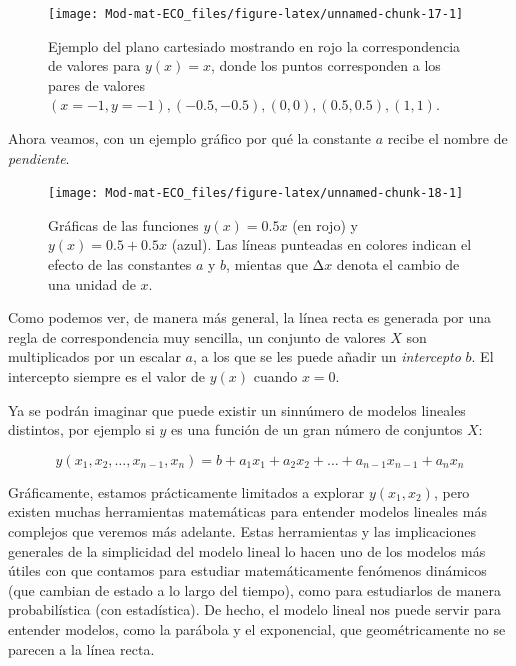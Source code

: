 \documentclass[
]{book}
\begin{document}
\begin{figure}

{\centering \texttt{[image: Mod-mat-ECO\_files/figure-latex/unnamed-chunk-17-1]} 

}

\caption{Ejemplo del plano cartesiado mostrando en rojo la correspondencia de valores para $y(x) = x$, donde los puntos corresponden a los pares de valores $(x = -1, y = -1), (-0.5, -0.5), (0, 0), (0.5, 0.5), (1, 1)$.}\label{fig:unnamed-chunk-17}
\end{figure}

Ahora veamos, con un ejemplo gráfico por qué la constante \(a\) recibe el nombre de \emph{pendiente}.

\begin{figure}

{\centering \texttt{[image: Mod-mat-ECO\_files/figure-latex/unnamed-chunk-18-1]} 

}

\caption{Gráficas de las funciones $y(x) = 0.5 x$ (en rojo) y $y(x) = 0.5 + 0.5 x$ (azul). Las líneas punteadas en colores indican el efecto de las constantes $a$ y $b$, mientas que Δ$x$ denota el cambio de una unidad de $x$.}\label{fig:unnamed-chunk-18}
\end{figure}

Como podemos ver, de manera más general, la línea recta es generada por una regla de correspondencia muy sencilla, un conjunto de valores \(X\) son multiplicados por un escalar \(a\), a los que se les puede añadir un \emph{intercepto} \(b\). El intercepto siempre es el valor de \(y(x)\) cuando \(x = 0\).

Ya se podrán imaginar que puede existir un sinnúmero de modelos lineales distintos, por ejemplo si \(y\) es una función de un gran número de conjuntos \(X\):

\begin{equation}
y(x_1, x_2, \dots, x_{n-1}, x_n) = b + a_1 x_1 + a_2 x_2 + \dots + a_{n-1} x_{n-1} + a_n x_n
\end{equation}

Gráficamente, estamos prácticamente limitados a explorar \(y(x_1, x_2)\), pero existen muchas herramientas matemáticas para entender modelos lineales más complejos que veremos más adelante. Estas herramientas y las implicaciones generales de la simplicidad del modelo lineal lo hacen uno de los modelos más útiles con que contamos para estudiar matemáticamente fenómenos dinámicos (que cambian de estado a lo largo del tiempo), como para estudiarlos de manera probabilística (con estadística). De hecho, el modelo lineal nos puede servir para entender modelos, como la parábola y el exponencial, que geométricamente no se parecen a la línea recta.
\end{document}
